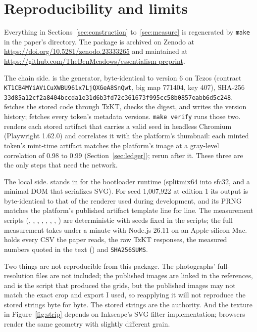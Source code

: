 \documentclass[11pt]{article}
\begin{document}
\section{Reproducibility and limits}
\label{sec:repro}

Everything in Sections~\ref{sec:construction} to~\ref{sec:measure} is regenerated by \texttt{make} in the paper's directory. The package is archived on Zenodo at \url{https://doi.org/10.5281/zenodo.23333265} and maintained at \url{https://github.com/TheBenMeadows/essentialism-preprint}.

{\sloppy The chain side.  is the generator, byte-identical to version 6 on Tezos (contract \texttt{KT1CB4MYiAViCuXWBU961x7LjQXGeA8SnQwt}, big map 771404, key 407), SHA-256 {\footnotesize\texttt{33d85a12cf2a8404bccda1e31d6b3fd72c361673f995cc58b0857eabb6d5c248}}.  fetches the stored code through TzKT, checks the digest, and writes the version history;  fetches every token's metadata versions. \texttt{make verify} runs those two.  renders each stored artifact that carries a valid seed in headless Chromium (Playwright 1.62.0) and correlates it with the platform's thumbnail: each minted token's mint-time artifact matches the platform's image at a gray-level correlation of 0.98 to 0.99 (Section~\ref{sec:ledger}); rerun  after it. These three are the only steps that need the network.\par}

{\sloppy The local side.  stands in for the bootloader runtime (splitmix64 into sfc32, and a minimal DOM that serializes SVG). For seed 1{,}007{,}922 at edition 1 its output is byte-identical to that of the renderer used during development, and its PRNG matches the platform's published artifact template line for line. The measurement scripts (, , , , , , , ) are deterministic with seeds fixed in the scripts; the full measurement takes under a minute with Node.js 26.11 on an Apple-silicon Mac.  holds every CSV the paper reads, the raw TzKT responses, the measured numbers quoted in the text () and \texttt{SHA256SUMS}.\par}

Two things are not reproducible from this package. The photographs' full-resolution files are not included; the published images are linked in the references, and  is the script that produced the grids, but the published images may not match the exact crop and export I used, so reapplying it will not reproduce the stored strings byte for byte. The stored strings are the authority. And the texture in Figure~\ref{fig:strip} depends on Inkscape's SVG filter implementation; browsers render the same geometry with slightly different grain.
\end{document}
